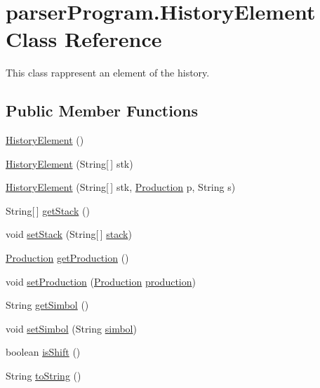 \hypertarget{classparser_program_1_1_history_element}{\section{parser\-Program.\-History\-Element Class Reference}
\label{classparser_program_1_1_history_element}
}


This class rappresent an element of the history.  


\subsection*{Public Member Functions}
\begin{DoxyCompactItemize}
\item 
\hyperlink{classparser_program_1_1_history_element_a45f360f314f688585844a62592bdb5c5}{History\-Element} ()
\item 
\hyperlink{classparser_program_1_1_history_element_ae6d3bdd3606301f0b08d4e9258b5c5cf}{History\-Element} (String\mbox{[}$\,$\mbox{]} stk)
\item 
\hyperlink{classparser_program_1_1_history_element_a0cd8852d35a48856c6e893ae33cbde30}{History\-Element} (String\mbox{[}$\,$\mbox{]} stk, \hyperlink{classcontext_free_1_1grammar_1_1_production}{Production} p, String s)
\item 
String\mbox{[}$\,$\mbox{]} \hyperlink{classparser_program_1_1_history_element_a8f20a699af1fa68f114acef0f72117b5}{get\-Stack} ()
\item 
void \hyperlink{classparser_program_1_1_history_element_a640ecb265a57f1b084fe99cf2a2a9a35}{set\-Stack} (String\mbox{[}$\,$\mbox{]} \hyperlink{classparser_program_1_1_history_element_a3ab04c9be50cda70dcfd9ee134884d9f}{stack})
\item 
\hyperlink{classcontext_free_1_1grammar_1_1_production}{Production} \hyperlink{classparser_program_1_1_history_element_a1e3354d1bc805c952c4ed9a35ddac0dd}{get\-Production} ()
\item 
void \hyperlink{classparser_program_1_1_history_element_a2311f48be369f4d0e6be47c2a7ac7546}{set\-Production} (\hyperlink{classcontext_free_1_1grammar_1_1_production}{Production} \hyperlink{classparser_program_1_1_history_element_a93323e030ba302f08564c7d6cd021a15}{production})
\item 
String \hyperlink{classparser_program_1_1_history_element_ab64610fe65f58bca7d542244378ac030}{get\-Simbol} ()
\item 
void \hyperlink{classparser_program_1_1_history_element_a54ecd254d7abd49d0d10230892dfc35b}{set\-Simbol} (String \hyperlink{classparser_program_1_1_history_element_a3c9ad24a6a0f33ac5d1cbc95ff1e82de}{simbol})
\item 
boolean \hyperlink{classparser_program_1_1_history_element_a233c9c55643f4d6bc8103c4e2c8bd038}{is\-Shift} ()
\item 
String \hyperlink{classparser_program_1_1_history_element_aa0ddd25dd8d27e59d63123b2f50e1cb4}{to\-String} ()
\end{DoxyCompactItemize}
